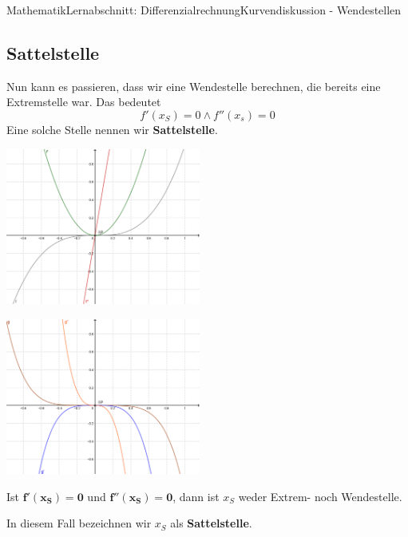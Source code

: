 \documentclass[11pt,twocolumn,oneside,openany,headings=optiontotoc,11pt,numbers=noenddot]{article}
\begin{document}
\begin{worksheet}{Mathematik}{Lernabschnitt: Differenzialrechnung}{Kurvendiskussion - Wendestellen}
		\subsection{Sattelstelle}
		Nun kann es passieren, dass wir eine Wendestelle berechnen, die bereits eine Extremstelle war. Das bedeutet \[f'(x_S) = 0 \wedge f''(x_s) = 0\] Eine solche Stelle nennen wir \textbf{Sattelstelle}.\\
		\par\noindent
		\includegraphics[width=0.48\textwidth]{../99_Bilder/045_SaS_Bsp1.png}\\
		\par\noindent
		\includegraphics[width=0.48\textwidth]{../99_Bilder/045_SaS_Bsp2.png}
		\begin{framed}
			\noindent
			Ist \(\mathbf{f'(x_S) = 0}\) und \(\mathbf{f''(x_S) = 0}\), dann ist \(x_S\) weder Extrem- noch Wendestelle.\\
			\par\noindent
			In diesem Fall bezeichnen wir \(x_S\) als \textbf{Sattelstelle}.
		\end{framed}
	\end{worksheet}
\end{document}
